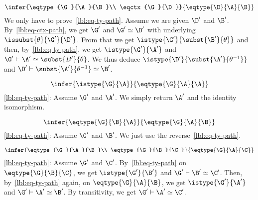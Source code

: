 
\begin{equation*}
  \infer
  {\eqtype{\G}{\A}{\B}\\
    \eqctx{\G}{\D}}
  {\eqtype{\D}{\A}{\B}}
\end{equation*}
%
We only have to prove~\eqref{lbl:eq-ty-path}.
Assume we are given $\D'$ and $\B'$.
By~\eqref{lbl:eq-ctx-path}, we get $\G'$ and $\G' \simeq \D'$
with underlying $\issubst{\theta}{\G'}{\D'}$.
From that we get $\istype{\G'}{\subst{\B'}{\theta}}$ and
then, by~\eqref{lbl:eq-ty-path}, we get $\istype{\G'}{\A'}$
and $\G' \vdash \A' \simeq \subst{B'}{\theta}$.
We thus deduce $\istype{\D'}{\subst{\A'}{\theta^{-1}}}$
and $\D' \vdash \subst{\A'}{\theta^{-1}} \simeq \B'$.



\begin{equation*}
  \infer
  {\istype{\G}{\A}}
  {\eqtype{\G}{\A}{\A}}
\end{equation*}
%
\eqref{lbl:eq-ty-path}:
Assume $\G'$ and $\A'$.
We simply return $\A'$ and the identity isomorphism.



\begin{equation*}
  \infer
  {\eqtype{\G}{\B}{\A}}
  {\eqtype{\G}{\A}{\B}}
\end{equation*}
%
\eqref{lbl:eq-ty-path}:
Assume $\G'$ and $\B'$.
We just use the reverse~\eqref{lbl:eq-ty-path}.



\begin{equation*}
  \infer
  {\eqtype{\G}{\A}{\B}\\
   \eqtype{\G}{\B}{\C}}
  {\eqtype{\G}{\A}{\C}}
\end{equation*}
%
\eqref{lbl:eq-ty-path}:
Assume $\G'$ and $\C'$.
By~\eqref{lbl:eq-ty-path} on $\eqtype{\G}{\B}{\C}$, we get
$\istype{\G'}{\B'}$ and $\G' \vdash \B' \simeq \C'$.
Then, by~\eqref{lbl:eq-ty-path} again, on $\eqtype{\G}{\A}{\B}$,
we get $\istype{\G'}{\A'}$ and $\G' \vdash \A' \simeq \B'$.
By transitivity, we get $\G' \vdash \A' \simeq \C'$.









